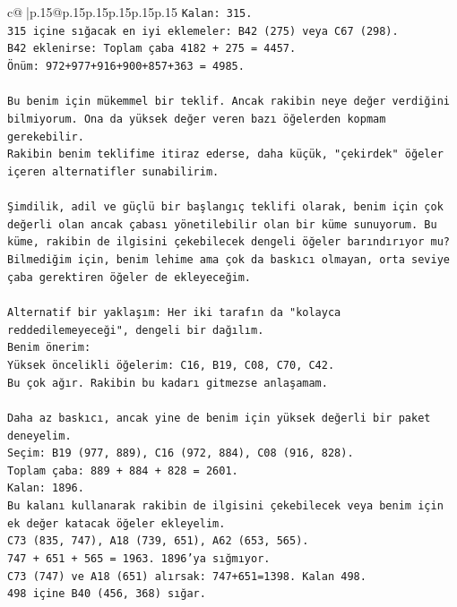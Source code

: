 \documentclass{article}
\begin{document}
{\begin{supertabular}{c@{$\;$}|p{.15\linewidth}@{}p{.15\linewidth}p{.15\linewidth}p{.15\linewidth}p{.15\linewidth}p{.15\linewidth}}
{{{\texttt{Kalan: 315.} \\
\texttt{315 içine sığacak en iyi eklemeler: B42 (275) veya C67 (298).} \\
\texttt{B42 eklenirse: Toplam çaba 4182 + 275 = 4457.} \\
\texttt{Önüm: 972+977+916+900+857+363 = 4985.} \\
\\ 
\texttt{Bu benim için mükemmel bir teklif. Ancak rakibin neye değer verdiğini bilmiyorum. Ona da yüksek değer veren bazı öğelerden kopmam gerekebilir.} \\
\texttt{Rakibin benim teklifime itiraz ederse, daha küçük, "çekirdek" öğeler içeren alternatifler sunabilirim.} \\
\\ 
\texttt{Şimdilik, adil ve güçlü bir başlangıç teklifi olarak, benim için çok değerli olan ancak çabası yönetilebilir olan bir küme sunuyorum. Bu küme, rakibin de ilgisini çekebilecek dengeli öğeler barındırıyor mu? Bilmediğim için, benim lehime ama çok da baskıcı olmayan, orta seviye çaba gerektiren öğeler de ekleyeceğim.} \\
\\ 
\texttt{Alternatif bir yaklaşım: Her iki tarafın da "kolayca reddedilemeyeceği", dengeli bir dağılım.} \\
\texttt{Benim önerim:} \\
\texttt{Yüksek öncelikli öğelerim: C16, B19, C08, C70, C42.} \\
\texttt{Bu çok ağır. Rakibin bu kadarı gitmezse anlaşamam.} \\
\\ 
\texttt{Daha az baskıcı, ancak yine de benim için yüksek değerli bir paket deneyelim.} \\
\texttt{Seçim: B19 (977, 889), C16 (972, 884), C08 (916, 828).} \\
\texttt{Toplam çaba: 889 + 884 + 828 = 2601.} \\
\texttt{Kalan: 1896.} \\
\texttt{Bu kalanı kullanarak rakibin de ilgisini çekebilecek veya benim için ek değer katacak öğeler ekleyelim.} \\
\texttt{C73 (835, 747), A18 (739, 651), A62 (653, 565).} \\
\texttt{747 + 651 + 565 = 1963. 1896'ya sığmıyor.} \\
\texttt{C73 (747) ve A18 (651) alırsak: 747+651=1398. Kalan 498.} \\
\texttt{498 içine B40 (456, 368) sığar.} \\
}}}
\end{supertabular}}
\end{document}
